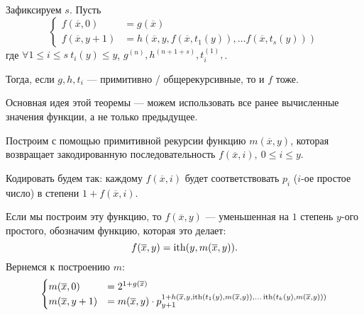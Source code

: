 \begin{thm}
    Зафиксируем $ s$. Пусть 
	\[
	\begin{cases}
		f(\overline{x}, 0) &= g(\overline{x}) \\
		f(\overline{x}, y+1) &= h(\overline{x}, y, f(\overline{x}, t_1(y)), \ldots f(\overline{x}, t_{s}(y)))
	\end{cases}
	\] 
	где $ \forall 1 \le i \le s ~t_i(y) \le y$, $ g^{(n)}, h^{(n+1+s)}, t_i^{(1)}, $.

	\noindent
	Тогда, если $ g, h, t_i$ --- примитивно / общерекурсивные, то и $ f$ тоже.
\end{thm}
Основная идея этой теоремы --- можем использовать все ранее вычисленные значения функции, а не только предыдущее.
\begin{proof*}
	Построим с помощью примитивной рекурсии функцию $ m(\overline{x}, y)$, которая возвращает закодированную последовательность $ f(\overline{x}, i), ~ 0 \le i \le y$.

	Кодировать будем так: каждому $ f(\overline{x}, i)$ будет соответствовать $ p_i$ ($ i$-ое простое число) в степени $ 1 + f(\overline{x}, i)$. 

	Если мы построим эту функцию, то $ f(\overline{x}, y)$ --- уменьшенная на $ 1$ степень $ y$-ого простого, обозначим функцию, которая это делает:
	\[
		f(\overline{x}, y) = \operatorname{ith}(y, m(\overline{x}, y))
	.\] 
	Вернемся к построению $ m$:
	\[
	\begin{cases}
		m(\overline{x}, 0) &= 2^{1+g(\overline{x})} \\
		m(\overline{x}, y+1) &= m(\overline{x}, y) \cdot p_{y+1}^{1+h\left( 
			\overline{x}, y, \operatorname{ith}(t_1(y), m(\overline{x}, y)), \ldots \operatorname{ith}(t_{k}(y), m(\overline{x}, y))
	\right)
}
	\end{cases}
	\] 
\end{proof*}


